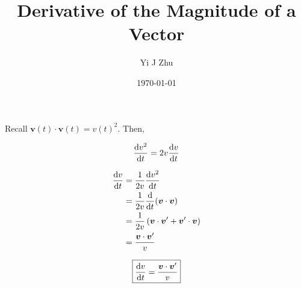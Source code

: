 \documentclass[12pt]{article}
\author{Yi J Zhu}
\title{Derivative of the Magnitude of a Vector}
\date{\today}
\numberwithin{equation}{section}
\begin{document}
	
	\maketitle
	
	Recall $ \boldsymbol{v}(t)\cdot \boldsymbol{v}(t) = v(t)^2$. Then,

	\begin{equation}
				\dv{v^2 }{t}= 2v\dv{v}{t}
	\end{equation}

	\begin{align}
		\dv{v}{t} &= \frac{1}{2v}\dv{v^2}{t}\\
		&= \frac{1}{2v}\dv{t}(\boldsymbol{v}\cdot \boldsymbol{v})\\
		&=  \frac{1}{2v} \left( \boldsymbol{v}\cdot \boldsymbol{v}' + \boldsymbol{v}'\cdot \boldsymbol{v}\right)\\
		&= \frac{\boldsymbol{v}\cdot \boldsymbol{v}'}{v}
	\end{align}
	
	\begin{equation}
			\boxed{\dv{v}{t} = \frac{\boldsymbol{v}\cdot \boldsymbol{v}'}{v}} 
	\end{equation}
	

	
\end{document}
